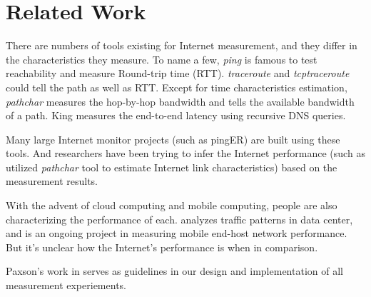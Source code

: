 \section{Related Work}
\label{sec:related-work}



There are numbers of tools existing for Internet measurement, and they differ in the characteristics they measure. To name a few, {\em ping} is famous to test reachability and measure Round-trip time (RTT). {\em traceroute}\cite{jacobson1989traceroute} and {\em tcptraceroute}\cite{toren2001tcptraceroute} could tell the path as well as RTT. Except for time characteristics estimation, {\em pathchar}\cite{jacobson1997pathchar} measures the hop-by-hop bandwidth and \cite{jain2002pathload} tells the available bandwidth of a path. King\cite{gummadi2002king} measures the end-to-end latency using recursive DNS queries. 

Many large Internet monitor projects (such as pingER\cite{matthews2000pinger}) are built using these tools. And researchers have been trying to infer the Internet performance (such as \cite{downey1999using} utilized {\em pathchar} tool to estimate Internet link characteristics) based on the measurement results. 

With the advent of cloud computing and mobile computing, people are also characterizing the performance of each. \cite{kandula2009nature, benson2010network} analyzes traffic patterns in data center, and \cite{huang2011mobiperf} is an ongoing project in measuring mobile end-host network performance. But it's unclear how the Internet's performance is when in comparison.

Paxson's work in \cite{paxson2004strategies} serves as guidelines in our design and implementation of all measurement experiements.


